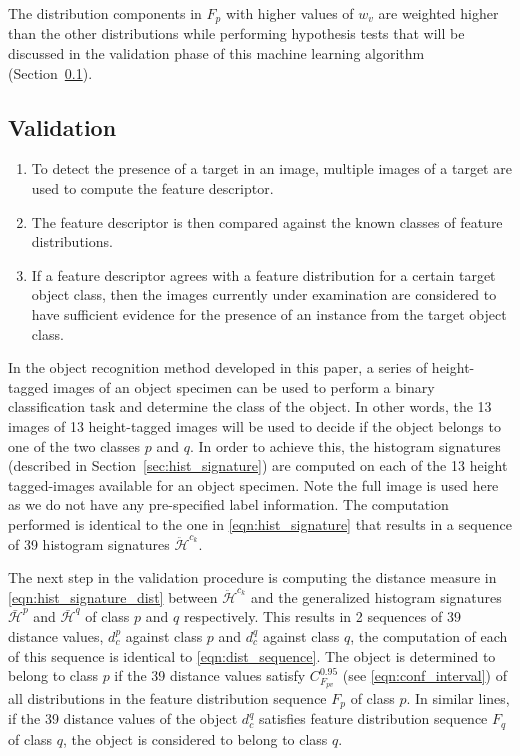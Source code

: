 \documentclass {udthesis}
\begin{document}
The distribution components in $F_p$ with higher values of $w_v$ are weighted higher than the other distributions while performing hypothesis tests that will be discussed in the validation phase of this machine learning algorithm (Section~\ref{sec:validation}).

\subsection{Validation}
\label{sec:validation}

\begin{enumerate}
	\item To detect the presence of a target in an image, multiple images of a target are used to compute the feature descriptor.
	
	\item The feature descriptor is then compared against the known classes of feature distributions.
	
	\item If a feature descriptor agrees with a feature distribution for a certain target object class, then the images currently under examination are considered to have sufficient evidence for the presence of an instance from the target object class.
\end{enumerate}

In the object recognition method developed in this paper, a series of height-tagged images of an object specimen can be used to perform a binary classification task and determine the class of the object. In other words, the 13 images of 13 height-tagged images will be used to decide if the object belongs to one of the two classes $p$ and $q$. In order to achieve this, the histogram signatures (described in Section~\ref{sec:hist_signature}) are computed on each of the 13 height tagged-images available for an object specimen. Note the full image is used here as we do not have any pre-specified label information. The computation performed is identical to the one in \eqref{eqn:hist_signature} that results in a sequence of 39 histogram signatures $\ddot{\mathcal{H}}^{c_{k}}$. 

The next step in the validation procedure is computing the distance measure in \eqref{eqn:hist_signature_dist} between $\ddot{\mathcal{H}}^{c_{k}}$ and the generalized histogram signatures $\bar{\mathcal{H}}^{p}$ and $\bar{\mathcal{H}}^{q}$ of class $p$ and $q$ respectively. This results in 2 sequences of 39 distance values, $d^p_c$ against class $p$ and $d^q_c$ against class $q$, the computation of each of this sequence is identical to \eqref{eqn:dist_sequence}. The object is determined to belong to class $p$ if the 39 distance values satisfy $C^{0.95}_{F_{pv}}$ (see \eqref{eqn:conf_interval}) of all distributions in the feature distribution sequence $F_p$ of class $p$. In similar lines, if the 39 distance values of the object $d^q_c$ satisfies feature distribution sequence $F_q$ of class $q$, the object is considered to belong to class $q$.
\end{document}
